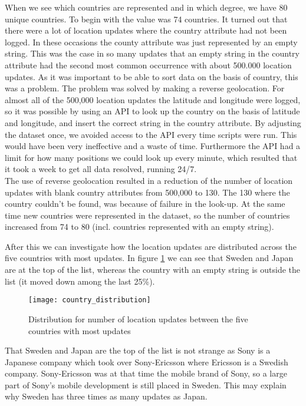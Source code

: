 When we see which countries are represented and in which degree, we have 80 unique countries. To begin with the value was 74 countries. It turned out that there were a lot of location updates where the country attribute had not been logged. In these occasions the county attribute was just represented by an empty string. This was the case in so many updates that an empty string in the country attribute had the second most common occurrence with about 500.000 location updates. 
As it was important to be able to sort data on the basis of country, this was a problem. The problem was solved by making a reverse geolocation. For almost all of the 500,000 location updates the latitude and longitude were logged, so it was possible by using an API\cite{reversegeocode} to look up the country on the basis of latitude and longitude, and insert the correct string in the country attribute. By adjusting the dataset once, we avoided access to the API every time scripts were run. This would have been very ineffective and a waste of time. Furthermore the API had a limit for how many positions we could look up every minute, which resulted that it took a week to get all data resolved, running 24/7.  \\ 
The use of reverse geolocation resulted in a reduction of the number of location updates with blank country attributes from 500,000 to 130. The 130 where the country couldn't be found, was because of failure in the look-up. At the same time new countries were represented in the dataset, so the number of countries increased from 74 to 80 (incl. countries represented with an empty string). 


After this we can investigate how the location updates are distributed across the five countries with most updates. In figure \ref{fig:country_dist} we can see that Sweden and Japan are at the top of the list, whereas the country with an empty string is outside the list (it moved down among the last 25\%). 


\begin{figure}[H]
    \hspace*{-1.0cm}
    \centering
    \texttt{[image: country\_distribution]}
    \caption{Distribution for number of location updates between the five countries with most updates}
    \label{fig:country_dist}
\end{figure}


That Sweden and Japan are the top of the list is not strange as Sony is a Japanese company which took over Sony-Ericsson where Ericsson is a Swedish company. Sony-Ericsson was at that time the mobile brand of Sony, so a large part of Sony's mobile development is still placed in Sweden. This may explain why Sweden has three times as many updates as Japan.  

